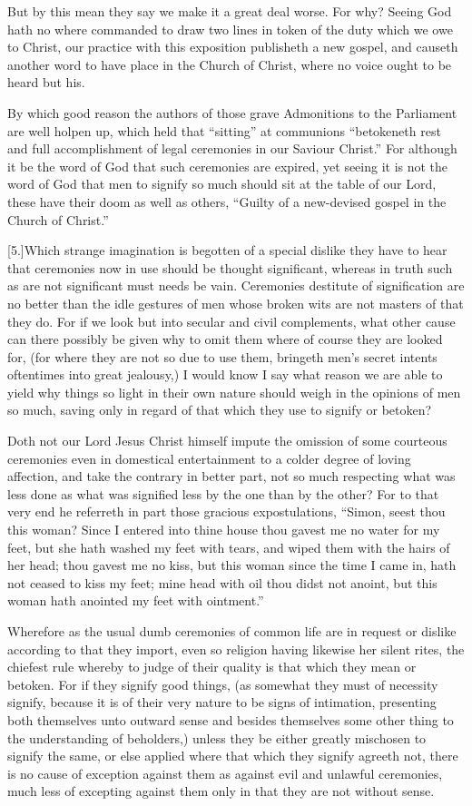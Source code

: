 But by this mean they say we make it a great deal worse.  For why?
 Seeing God hath no where commanded to draw two lines in token of the duty which we owe to Christ, our practice with this exposition publisheth a new gospel, and causeth another word to have place in the Church of Christ, where no voice ought to be heard but his.

By which good reason the authors of those grave Admonitions to the Parliament are well holpen up, which held that “sitting” at communions “betokeneth rest and full accomplishment of legal ceremonies in our Saviour Christ.” For although it be the word of God that such ceremonies are expired, yet seeing it is not the word of God that men to signify so much should sit at the table of our Lord, these have their doom as well as others, “Guilty of a new-devised gospel in the Church of Christ.”

[5.]Which strange imagination is begotten of a special dislike they have to hear that ceremonies now in use should be thought significant, whereas in truth such as are not significant must needs be vain. Ceremonies destitute of signification are no better than the idle gestures of men whose broken wits are not masters of that they do. For if we look but into secular and civil complements, what other cause can there possibly be given why to omit them where of course they are looked for, (for where they are not so due to use them, bringeth men’s secret intents oftentimes into great jealousy,) I would know I say what reason we are able to yield why things so light in their own nature should weigh in the opinions of men so much, saving only in regard of that which they use to signify or betoken?

Doth not our Lord Jesus Christ himself impute the omission  of some courteous ceremonies even in domestical entertainment to a colder degree of loving affection, and take the contrary in better part, not so much respecting what was less done as what was signified less by the one than by the other?
 For to that very end he referreth in part those gracious expostulations, “Simon, seest thou this woman? Since I entered into thine house thou gavest me no water for my feet, but she hath washed my feet with tears, and wiped them with the hairs of her head; thou gavest me no kiss, but this woman since the time I came in, hath not ceased to kiss my feet; mine head with oil thou didst not anoint, but this woman hath anointed my feet with ointment.”

Wherefore as the usual dumb ceremonies of common life are in request or dislike according to that they import, even so religion having likewise her silent rites, the chiefest rule whereby to judge of their quality is that which they mean or betoken. For if they signify good things, (as somewhat they must of necessity signify, because it is of their very nature to be signs of intimation, presenting both themselves unto outward sense and besides themselves some other thing to the understanding of beholders,) unless they be either greatly mischosen to signify the same, or else applied where that which they signify agreeth not, there is no cause of exception against them as against evil and unlawful ceremonies, much less of excepting against them only in that they are not without sense.

